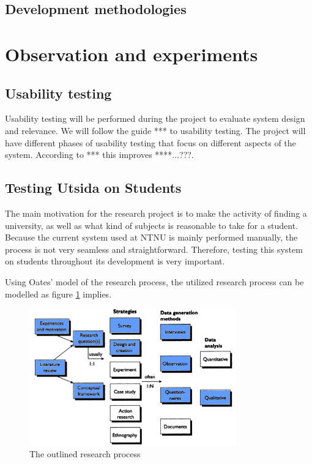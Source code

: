 \subsection{Development methodologies}


\section{Observation and experiments}


\subsection{Usability testing}
Usability testing will be performed during the project to evaluate system design and relevance. We will follow the guide *** to usability testing. The project will have different phases of usability testing that focus on different aspects of the system. According to *** this improves ****...???. 

\subsection{Testing Utsida on Students}
The main motivation for the research project is to make the activity of finding a university, as well as what kind of subjects is reasonable to take for a student. Because the current system used at NTNU is mainly performed manually, the process is not very seamless and straightforward. Therefore, testing this system on students throughout its development is very important.

\fi






Using Oates'\cite{oates2005researching} model of the research process, the utilized research process can be modelled as figure \ref{fig:research_process} implies.

\begin{figure}[H]
    \centering
    \includegraphics[width=0.8\textwidth]{fig/research_process.png}
    \caption{The outlined research process}
    \label{fig:research_process}
\end{figure}


